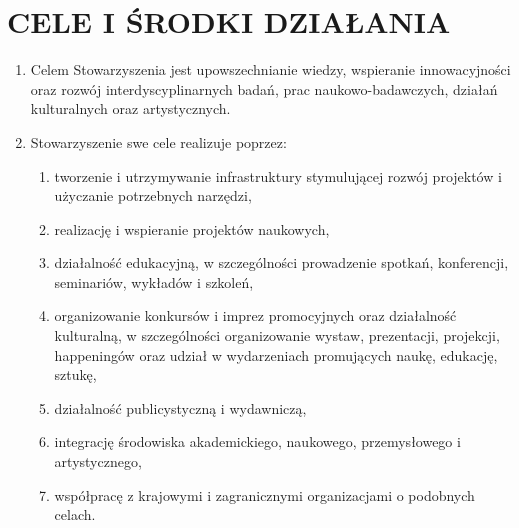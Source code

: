 \documentclass{article}
\begin{document}
\section{CELE I ŚRODKI DZIAŁANIA}
  \begin{enumerate}
    \item Celem Stowarzyszenia jest upowszechnianie wiedzy, wspieranie innowacyjności oraz rozwój interdyscyplinarnych badań, prac naukowo-badawczych, działań kulturalnych oraz artystycznych.
    \item Stowarzyszenie swe cele realizuje poprzez:
      \begin{enumerate}
        \item tworzenie i utrzymywanie infrastruktury stymulującej rozwój projektów i użyczanie potrzebnych narzędzi,
        \item realizację i wspieranie projektów naukowych,
        \item działalność edukacyjną, w szczególności prowadzenie spotkań, konferencji, seminariów, wykładów i szkoleń,
        \item organizowanie konkursów i imprez promocyjnych oraz działalność kulturalną, w szczególności organizowanie wystaw, prezentacji, projekcji, happeningów oraz udział w wydarzeniach promujących naukę, edukację, sztukę,
        \item działalność publicystyczną i wydawniczą,
        \item integrację środowiska akademickiego, naukowego, przemysłowego i artystycznego,
        \item współpracę z krajowymi i zagranicznymi organizacjami o podobnych celach.
      \end{enumerate}
  \end{enumerate}
\end{document}
